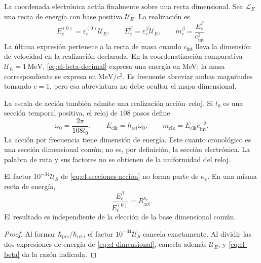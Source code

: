La coordenada electrónica actúa finalmente sobre una recta dimensional.
Sea \(\mathcal L_E\) una recta de energía con base positiva
\(\mathcal U_E\). La realización es
\begin{equation}
 E_e^{(0)}=\varepsilon_e^{(0)}\mathcal U_E,\qquad
 E_e^\beta=\varepsilon_e^\beta\mathcal U_E,
 \qquad m_e^\beta=\frac{E_e^\beta}{c_{\mathrm{int}}^2}.
 \label{eq:el-dimensional}
\end{equation}
La última expresión pertenece a la recta de masa cuando
\(c_{\mathrm{int}}\) lleva la dimensión de velocidad en la realización
declarada. En la coordenatización comparativa \(\mathcal U_E=1\,\mathrm{MeV}\),
\eqref{eq:el-beta-decimal} expresa una energía en MeV; la masa
correspondiente se expresa en \(\mathrm{MeV}/c^2\). Es frecuente
abreviar ambas magnitudes tomando \(c=1\), pero esa abreviatura no
debe ocultar el mapa dimensional.

La escala de acción también admite una realización acción--reloj. Si
\(t_0\) es una sección temporal positiva, el reloj de \(108\) pasos
define
\begin{equation}
 \omega_0=\frac{2\pi}{108t_0},\qquad
 E_{\mathrm{clk}}=\hbar_{\mathrm{ret}}\omega_0,\qquad
 m_{\mathrm{clk}}=E_{\mathrm{clk}}c_{\mathrm{int}}^{-2}.
 \label{eq:el-cuanto-reloj}
\end{equation}
La acción por frecuencia tiene dimensión de energía. Este cuanto
cronológico es una sección dimensional común; no es, por definición,
la sección electrónica. La palabra de ruta y sus factores no se
obtienen de la uniformidad del reloj.

\begin{proposition}
El factor \(10^{-34}\mathcal U_S\) de
\eqref{eq:el-secciones-accion} no forma parte de \(\kappa_e\). En
una misma recta de energía,
\begin{equation}
 \frac{E_e^\beta}{E_e^{(0)}}=R_{\mathrm{act}}^{\kappa_e}.
 \label{eq:el-razon-energia}
\end{equation}
El resultado es independiente de la elección de la base dimensional
común.
\end{proposition}
\begin{proof}
Al formar \(\hbar_{\mathrm{pre}}/\hbar_{\mathrm{ret}}\), el factor
\(10^{-34}\mathcal U_S\) cancela exactamente. Al dividir las dos
expresiones de energía de \eqref{eq:el-dimensional}, cancela además
\(\mathcal U_E\), y \eqref{eq:el-beta} da la razón indicada.
\end{proof}

